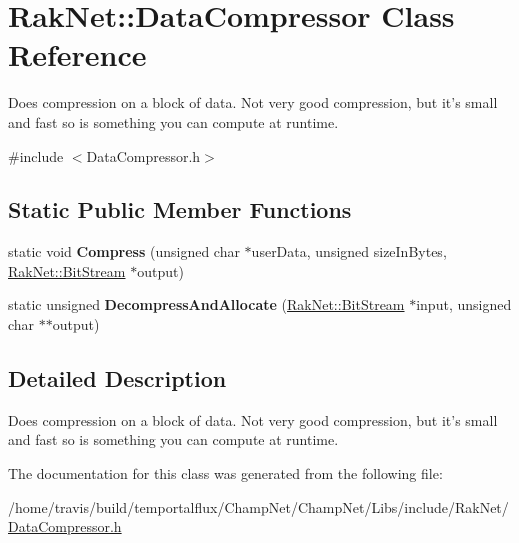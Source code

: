 \hypertarget{class_rak_net_1_1_data_compressor}{\section{Rak\-Net\-:\-:Data\-Compressor Class Reference}
\label{class_rak_net_1_1_data_compressor}
}


Does compression on a block of data. Not very good compression, but it's small and fast so is something you can compute at runtime.  




{\ttfamily \#include $<$Data\-Compressor.\-h$>$}

\subsection*{Static Public Member Functions}
\begin{DoxyCompactItemize}
\item 
\hypertarget{class_rak_net_1_1_data_compressor_a8654e0f10eef655e62acfd99ec093b6c}{static void {\bfseries Compress} (unsigned char $\ast$user\-Data, unsigned size\-In\-Bytes, \hyperlink{class_rak_net_1_1_bit_stream}{Rak\-Net\-::\-Bit\-Stream} $\ast$output)}\label{class_rak_net_1_1_data_compressor_a8654e0f10eef655e62acfd99ec093b6c}

\item 
\hypertarget{class_rak_net_1_1_data_compressor_a6de4f9842339484155d840385661b89f}{static unsigned {\bfseries Decompress\-And\-Allocate} (\hyperlink{class_rak_net_1_1_bit_stream}{Rak\-Net\-::\-Bit\-Stream} $\ast$input, unsigned char $\ast$$\ast$output)}\label{class_rak_net_1_1_data_compressor_a6de4f9842339484155d840385661b89f}

\end{DoxyCompactItemize}


\subsection{Detailed Description}
Does compression on a block of data. Not very good compression, but it's small and fast so is something you can compute at runtime. 

The documentation for this class was generated from the following file\-:\begin{DoxyCompactItemize}
\item 
/home/travis/build/temportalflux/\-Champ\-Net/\-Champ\-Net/\-Libs/include/\-Rak\-Net/\hyperlink{_data_compressor_8h}{Data\-Compressor.\-h}\end{DoxyCompactItemize}

